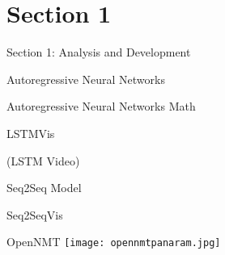 
\section{Section 1}


\begin{frame}{Section 1: Analysis and Development}

\end{frame}


\begin{frame}{Autoregressive Neural Networks}
\end{frame}


\begin{frame}{Autoregressive Neural Networks Math}
\end{frame}

\begin{frame}{LSTMVis}

  (LSTM Video)


\end{frame}

\begin{frame}{Seq2Seq Model}
\end{frame}

\begin{frame}{Seq2SeqVis}

  
\end{frame}


\begin{frame}{OpenNMT}
  \texttt{[image: opennmtpanaram.jpg]}
\end{frame}
